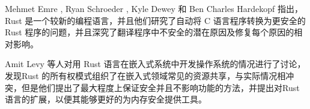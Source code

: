 \documentclass{article}
\begin{document}
Mehmet Emre , Ryan Schroeder , Kyle Dewey 和 Ben Charles Hardekopf 指出，Rust 是一个较新的编程语言，并且他们研究了自动将 C 语言程序转换为更安全的 Rust 程序的问题，并且深究了翻译程序中不安全的潜在原因及修复每个原因的相对影响。\supercite{ref17}

Amit Levy 等人对用 Rust 语言在嵌入式系统中开发操作系统的情况进行了讨论，发现Rust 的所有权模式组织了在嵌入式领域常见的资源共享，与实际情况相冲突，但是他们提出了最大程度上保证安全并且不影响功能的方法，并提出对Rust语言的扩展，以便其能够更好的为内存安全提供工具。\supercite{ref18}



 

\newpage




\printbibliography[ title = {参考文献}]
\end{document}
